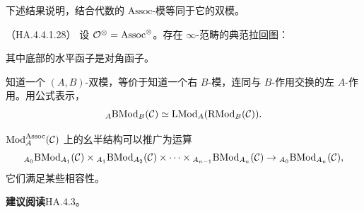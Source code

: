 \nitem\label{L24-4.3} 下述结果说明，结合代数的 $\mathrm{Assoc}$-模等同于它的双模。

\begin{proposition}\label{L24-4.4}（HA.4.4.1.28）
设 $\mathcal{O}^{\otimes}=\mathrm{Assoc}^{\otimes}$。存在 $\infty$-范畴的典范拉回图：
\begin{center}
\end{center}
其中底部的水平函子是对角函子。
\end{proposition}


\nitem\label{L24-A.1} 知道一个 $(A,B)$-双模，等价于知道一个右 $B$-模，连同与 $B$-作用交换的左 $A$-作用。用公式表示，
\[
{}_{A}\mathrm{BMod}_{B}(\mathcal{C})\simeq\mathrm{LMod}_{A}(\mathrm{RMod}_{B}(\mathcal{C})).
\]

\nitem\label{L24-A.2} $\operatorname{Mod}^{\mathrm{Assoc}}_{A}(\mathcal{C})$ 上的幺半结构可以推广为运算
\[
{}_{A_{0}}\mathrm{BMod}_{A_{1}}(\mathcal{C})\times{}_{A_{1}}\mathrm{BMod}_{A_{2}}(\mathcal{C})\times\cdots\times{}_{A_{n-1}}\mathrm{BMod}_{A_{n}}(\mathcal{C})\to{}_{A_{0}}\mathrm{BMod}_{A_{n}}(\mathcal{C}),
\]
它们满足某些相容性。

\nitem\label{L24-A.3} \textbf{建议阅读}\quad HA.4.3。
